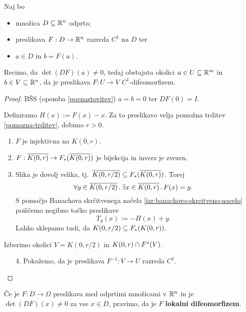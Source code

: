 \newpage
\begin{izrek}
    \label{izr:inverzna-preslikava}
    Naj bo 
    \begin{itemize}
        \item množica $D \subseteq \mathbb{R}^n$ odprta;
        \item preslikava $F: D \to \mathbb{R}^n$ razreda $C^1$ na \(D\) ter
        \item $a \in D$ in $b = F(a)$.
    \end{itemize}
    Recimo, da $\det(DF)(a) \neq 0$, tedaj obstajata okolici $a \in U \subseteq \mathbb{R}^m$ in $b \in V \subseteq \mathbb{R}^n$, da je preslikava $F: U \to V$ $C^1$-difeomorfizem. 
\end{izrek}

\begin{proof}
    BŠS (opomba \ref{poenastovitev}) \(a = b = 0\) ter \(DF(0) = I\).
    
    Definiramo \(H(x) := F(x) - x\). Za to preslikavo velja pomožna trditev \ref{pomozna-trditev}, dobimo \(r > 0\). 
    \begin{enumerate}
        \item \(F\) je injektivna na \(\overline{K(0, r)}\).
        \item \(F: \overline{K(0, r)} \to F_{*}(\overline{K(0, r)})\) je bijekcija in inverz je zvezen.
        \item Slika je dovolj velika, tj.\ \(\overline{K(0, r/2)} \subseteq F_{*}(\overline{K(0, r)})\). Torej 
        \[\forall y \in \overline{K(0, r / 2)}  \,.\, \exists x \in \overline{K(0, r)} \,.\,F(x) = y.\]
        S pomočjo Banachova skrčitvenega načela \ref{izr:banachovo-skrcitveno-nacelo} poiščemo negibno točko preslikave 
        \[T_y(x) := -H(x) + y.\]
        Lahko sklepamo tudi, da \(K(0, r/2) \subseteq F_{*}(K(0, r))\).
    \end{enumerate}
    Izberimo okolici \(V = K(0, r/2)\) in \(K(0, r) \cap F^{*}(V)\).
    \begin{enumerate}
        \item[4.] Pokažemo, da je preslikava \(F^{-1}: V \to U\) razreda \(C^1\). \qedhere 
    \end{enumerate}
\end{proof}

\begin{definicija}
    Če je $F: D \to \Omega$ preslikava med odprtimi množicami v $\mathbb{R}^n$ in je $\det(DF)(x) \neq 0$ za vse $x \in D$, pravimo, da je $F$ \textbf{lokalni difeomorfizem}.
\end{definicija}

